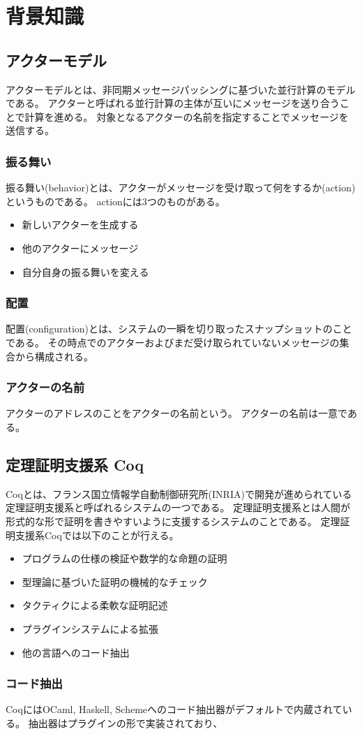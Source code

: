 \chapter{背景知識}

\section{アクターモデル}

アクターモデルとは、非同期メッセージパッシングに基づいた並行計算のモデルである。
アクターと呼ばれる並行計算の主体が互いにメッセージを送り合うことで計算を進める。
対象となるアクターの名前を指定することでメッセージを送信する。


\subsection{振る舞い}

振る舞い(behavior)とは、アクターがメッセージを受け取って何をするか(action)というものである。
actionには3つのものがある。

\begin{itemize}
\item 新しいアクターを生成する
\item 他のアクターにメッセージ
\item 自分自身の振る舞いを変える
\end{itemize}


\subsection{配置}

配置(configuration)とは、システムの一瞬を切り取ったスナップショットのことである。
その時点でのアクターおよびまだ受け取られていないメッセージの集合から構成される。

\subsection{アクターの名前}

アクターのアドレスのことをアクターの名前という。
アクターの名前は一意である。


\section{定理証明支援系 Coq}

Coqとは、フランス国立情報学自動制御研究所(INRIA)で開発が進められている定理証明支援系と呼ばれるシステムの一つである。
定理証明支援系とは人間が形式的な形で証明を書きやすいように支援するシステムのことである。
定理証明支援系Coqでは以下のことが行える。

\begin{itemize}
\item プログラムの仕様の検証や数学的な命題の証明
\item 型理論に基づいた証明の機械的なチェック
\item タクティクによる柔軟な証明記述
\item プラグインシステムによる拡張
\item 他の言語へのコード抽出
\end{itemize}

\subsection{コード抽出}

CoqにはOCaml, Haskell, Schemeへのコード抽出器がデフォルトで内蔵されている。
抽出器はプラグインの形で実装されており、
